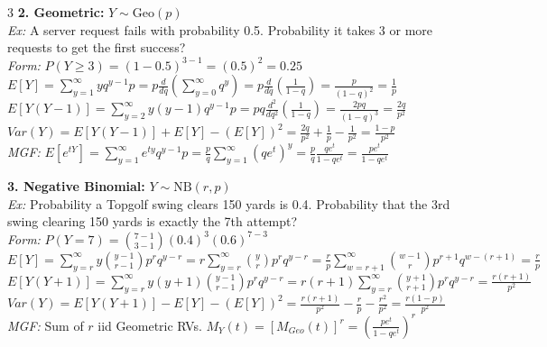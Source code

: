 \documentclass[10pt]{article}
\begin{document}
\begin{multicols*}{3}
\textbf{2. Geometric:} $Y \sim \text{Geo}(p)$\\
\textit{Ex:} A server request fails with probability 0.5. Probability it takes 3 or more requests to get the first success?\\
\textit{Form:} $P(Y \ge 3) = (1-0.5)^{3-1} = (0.5)^2 = 0.25$\\
$E[Y] = \sum_{y=1}^{\infty} y q^{y-1} p = p \frac{d}{dq} (\sum_{y=0}^{\infty} q^y) = p \frac{d}{dq} (\frac{1}{1-q}) = \frac{p}{(1-q)^2} = \frac{1}{p}$\\
$E[Y(Y-1)] = \sum_{y=2}^{\infty} y(y-1) q^{y-1} p = pq \frac{d^2}{dq^2} (\frac{1}{1-q}) = \frac{2pq}{(1-q)^3} = \frac{2q}{p^2}$\\
$Var(Y) = E[Y(Y-1)] + E[Y] - (E[Y])^2 = \frac{2q}{p^2} + \frac{1}{p} - \frac{1}{p^2} = \frac{1-p}{p^2}$\\
\textit{MGF:} $E[e^{tY}] = \sum_{y=1}^{\infty} e^{ty} q^{y-1} p = \frac{p}{q} \sum_{y=1}^{\infty} (qe^t)^y = \frac{p}{q} \frac{qe^t}{1-qe^t} = \frac{pe^t}{1-qe^t}$

\vspace{2mm}

\textbf{3. Negative Binomial:} $Y \sim \text{NB}(r, p)$\\
\textit{Ex:} Probability a Topgolf swing clears 150 yards is 0.4. Probability that the 3rd swing clearing 150 yards is exactly the 7th attempt?\\
\textit{Form:} $P(Y=7) = \binom{7-1}{3-1} (0.4)^3 (0.6)^{7-3}$\\
$E[Y] = \sum_{y=r}^{\infty} y \binom{y-1}{r-1} p^r q^{y-r} = r \sum_{y=r}^{\infty} \binom{y}{r} p^r q^{y-r} = \frac{r}{p} \sum_{w=r+1}^{\infty} \binom{w-1}{r} p^{r+1} q^{w-(r+1)} = \frac{r}{p}$\\
$E[Y(Y+1)] = \sum_{y=r}^{\infty} y(y+1)\binom{y-1}{r-1}p^r q^{y-r} = r(r+1)\sum_{y=r}^{\infty} \binom{y+1}{r+1}p^r q^{y-r} = \frac{r(r+1)}{p^2}$\\
$Var(Y) = E[Y(Y+1)] - E[Y] - (E[Y])^2 = \frac{r(r+1)}{p^2} - \frac{r}{p} - \frac{r^2}{p^2} = \frac{r(1-p)}{p^2}$\\
\textit{MGF:} Sum of $r$ iid Geometric RVs. $M_Y(t) = [M_{Geo}(t)]^r = (\frac{pe^t}{1-qe^t})^r$

\vspace{2mm}


\end{multicols*}
\end{document}
